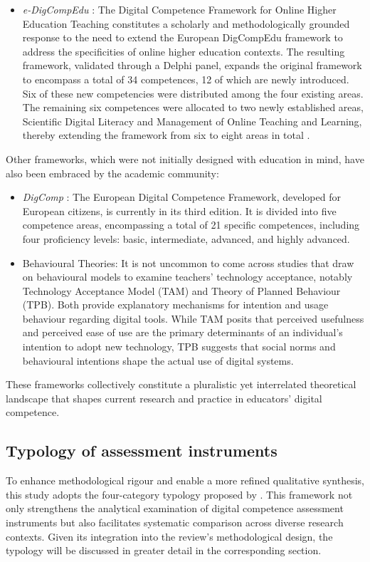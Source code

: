 \documentclass[english]{textolivre}
\begin{document}
\begin{itemize}
    \item \textit{e-DigCompEdu} \cite{santos2026edigcompedu}: The Digital Competence Framework for Online Higher Education Teaching constitutes a scholarly and methodologically grounded response to the need to extend the European DigCompEdu framework to address the specificities of online higher education contexts. The resulting framework, validated through a Delphi panel, expands the original framework to encompass a total of 34 competences, 12 of which are newly introduced. Six of these new competencies were distributed among the four existing areas. The remaining six competences were allocated to two newly established areas, Scientific Digital Literacy and Management of Online Teaching and Learning, thereby extending the framework from six to eight areas in total \cite{santos2025validation}.
\end{itemize}

Other frameworks, which were not initially designed with education in mind, have also been embraced by the academic community:

\begin{itemize}
    \item \textit{DigComp} \cite{Cosgrove2025}: The European Digital Competence Framework, developed for European citizens, is currently in its third edition. It is divided into five competence areas, encompassing a total of 21 specific competences, including four proficiency levels: basic, intermediate, advanced, and highly advanced.
    \item Behavioural Theories: It is not uncommon to come across studies that draw on behavioural models to examine teachers’ technology acceptance, notably  Technology Acceptance Model (TAM) and  Theory of Planned Behaviour (TPB). Both provide explanatory mechanisms for intention and usage behaviour regarding digital tools. While TAM posits that perceived usefulness and perceived ease of use are the primary determinants of an individual’s intention to adopt new technology, TPB suggests that social norms and behavioural intentions shape the actual use of digital systems.
\end{itemize}

These frameworks collectively constitute a pluralistic yet interrelated theoretical landscape that shapes current research and practice in educators’ digital competence.

\subsection{Typology of assessment instruments}\label{sec-modelo}
To enhance methodological rigour and enable a more refined qualitative synthesis, this study adopts the four-category typology proposed by \textcite{mattar2022digcomp}. This framework not only strengthens the analytical examination of digital competence assessment instruments but also facilitates systematic comparison across diverse research contexts. Given its integration into the review’s methodological design, the typology will be discussed in greater detail in the corresponding section.
\end{document}
